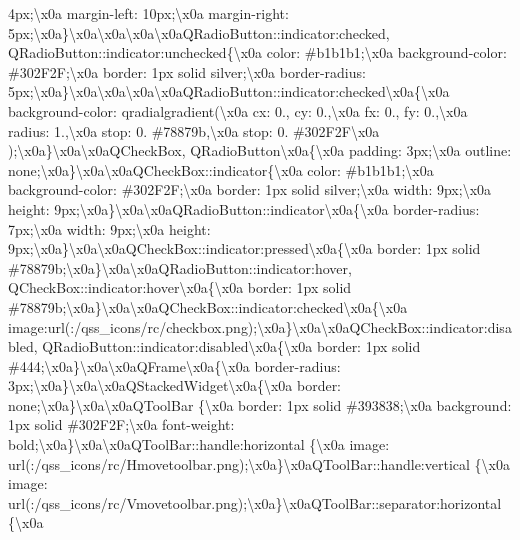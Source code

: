 \begin{DoxyCompactItemize}
4px;\textbackslash{}x0a margin-\/left\+: 10px;\textbackslash{}x0a margin-\/right\+: 5px;\textbackslash{}x0a\}\textbackslash{}x0a\textbackslash{}x0a\textbackslash{}x0a\textbackslash{}x0a\+Q\+Radio\+Button\+::indicator\+:checked, Q\+Radio\+Button\+::indicator\+:unchecked\{\textbackslash{}x0a color\+: \#b1b1b1;\textbackslash{}x0a background-\/color\+: \#302\+F2\+F;\textbackslash{}x0a border\+: 1px solid silver;\textbackslash{}x0a border-\/radius\+: 5px;\textbackslash{}x0a\}\textbackslash{}x0a\textbackslash{}x0a\textbackslash{}x0a\textbackslash{}x0a\+Q\+Radio\+Button\+::indicator\+:checked\textbackslash{}x0a\{\textbackslash{}x0a background-\/color\+: qradialgradient(\textbackslash{}x0a cx\+: 0., cy\+: 0.,\textbackslash{}x0a fx\+: 0., fy\+: 0.,\textbackslash{}x0a radius\+: 1.,\textbackslash{}x0a stop\+: 0. \#78879b,\textbackslash{}x0a stop\+: 0. \#302\+F2\+F\textbackslash{}x0a );\textbackslash{}x0a\}\textbackslash{}x0a\textbackslash{}x0a\+Q\+Check\+Box, Q\+Radio\+Button\textbackslash{}x0a\{\textbackslash{}x0a padding\+: 3px;\textbackslash{}x0a outline\+: none;\textbackslash{}x0a\}\textbackslash{}x0a\textbackslash{}x0a\+Q\+Check\+Box\+::indicator\{\textbackslash{}x0a color\+: \#b1b1b1;\textbackslash{}x0a background-\/color\+: \#302\+F2\+F;\textbackslash{}x0a border\+: 1px solid silver;\textbackslash{}x0a width\+: 9px;\textbackslash{}x0a height\+: 9px;\textbackslash{}x0a\}\textbackslash{}x0a\textbackslash{}x0a\+Q\+Radio\+Button\+::indicator\textbackslash{}x0a\{\textbackslash{}x0a border-\/radius\+: 7px;\textbackslash{}x0a width\+: 9px;\textbackslash{}x0a height\+: 9px;\textbackslash{}x0a\}\textbackslash{}x0a\textbackslash{}x0a\+Q\+Check\+Box\+::indicator\+:pressed\textbackslash{}x0a\{\textbackslash{}x0a border\+: 1px solid \#78879b;\textbackslash{}x0a\}\textbackslash{}x0a\textbackslash{}x0a\+Q\+Radio\+Button\+::indicator\+:hover, Q\+Check\+Box\+::indicator\+:hover\textbackslash{}x0a\{\textbackslash{}x0a border\+: 1px solid \#78879b;\textbackslash{}x0a\}\textbackslash{}x0a\textbackslash{}x0a\+Q\+Check\+Box\+::indicator\+:checked\textbackslash{}x0a\{\textbackslash{}x0a image\+:url(\+:/qss\+\_\+icons/rc/checkbox.\+png);\textbackslash{}x0a\}\textbackslash{}x0a\textbackslash{}x0a\+Q\+Check\+Box\+::indicator\+:disabled, Q\+Radio\+Button\+::indicator\+:disabled\textbackslash{}x0a\{\textbackslash{}x0a border\+: 1px solid \#444;\textbackslash{}x0a\}\textbackslash{}x0a\textbackslash{}x0a\+Q\+Frame\textbackslash{}x0a\{\textbackslash{}x0a border-\/radius\+: 3px;\textbackslash{}x0a\}\textbackslash{}x0a\textbackslash{}x0a\+Q\+Stacked\+Widget\textbackslash{}x0a\{\textbackslash{}x0a border\+: none;\textbackslash{}x0a\}\textbackslash{}x0a\textbackslash{}x0a\+Q\+Tool\+Bar \{\textbackslash{}x0a border\+: 1px solid \#393838;\textbackslash{}x0a background\+: 1px solid \#302\+F2\+F;\textbackslash{}x0a font-\/weight\+: bold;\textbackslash{}x0a\}\textbackslash{}x0a\textbackslash{}x0a\+Q\+Tool\+Bar\+::handle\+:horizontal \{\textbackslash{}x0a image\+: url(\+:/qss\+\_\+icons/rc/\+Hmovetoolbar.\+png);\textbackslash{}x0a\}\textbackslash{}x0a\+Q\+Tool\+Bar\+::handle\+:vertical \{\textbackslash{}x0a image\+: url(\+:/qss\+\_\+icons/rc/\+Vmovetoolbar.\+png);\textbackslash{}x0a\}\textbackslash{}x0a\+Q\+Tool\+Bar\+::separator\+:horizontal \{\textbackslash{}x0a 
\end{DoxyCompactItemize}
